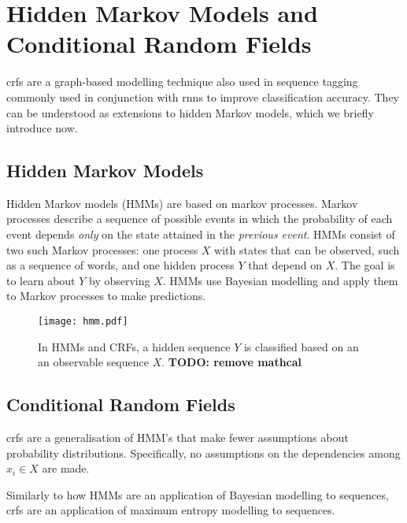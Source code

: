 \section[Conditional Random Fields]{Hidden Markov Models and Conditional Random Fields}

\Glspl{crf}\cite{originalCRF} are a graph-based modelling technique also used in sequence tagging commonly used in conjunction with \glspl{rnn} to improve classification accuracy. They can be understood as extensions to hidden Markov models, which we briefly introduce now.

\subsection{Hidden Markov Models}

    Hidden Markov models (HMMs) are based on markov processes. Markov processes describe a sequence of possible events in which the probability of each event depends \textit{only} on the state attained in the \textit{previous event}\cite{gagniuc2017markov}.
    HMMs consist of two such Markov processes: one process $X$ with states that can be observed, such as a sequence of words, and one hidden process $Y$ that depend on $X$. The goal is to learn about $Y$ by observing $X$. HMMs use Bayesian modelling and apply them to Markov processes to make predictions\cite{klinger2007classical}.
   
    \begin{figure}[t]
        \centering
        \texttt{[image: hmm.pdf]}
        \caption{In HMMs and CRFs, a hidden sequence $Y$ is classified based on an an observable sequence $X$. \color{red}\textbf{TODO: remove mathcal}}
        \label{fig: HMM and CRF}
    \end{figure}

\subsection{Conditional Random Fields}
    \Glspl{crf} are a generalisation of HMM's that make fewer assumptions about probability distributions. Specifically, no assumptions on the dependencies among $x_{i} \in X$ are made\cite{klinger2007classical}. 
    
    Similarly to how HMMs are an application of Bayesian modelling to sequences, \glspl{crf} are an application of maximum entropy modelling to sequences\cite{klinger2007classical}.